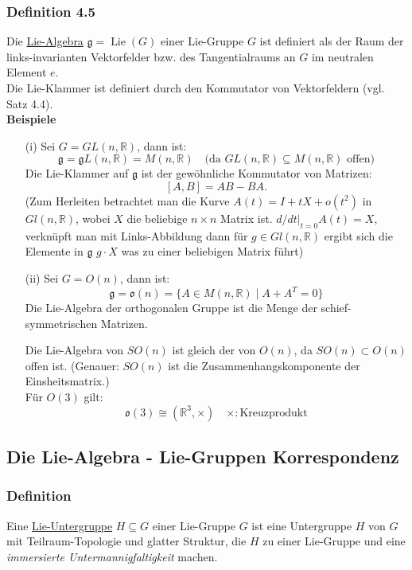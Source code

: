 \documentclass[fleqn, 12pt, letterpaper]{article}
\newcommand{\txt}[1]{\text{#1}}
\begin{document}
\subsubsection*{Definition 4.5}
Die \underline{Lie-Algebra} \( \mathfrak{g} = \operatorname{Lie}(G) \) einer Lie-Gruppe \( G \) ist definiert als der Raum der links-invarianten Vektorfelder bzw. des Tangentialraums an \( G \) im neutralen Element \( e \). \\

Die Lie-Klammer ist definiert durch den Kommutator von Vektorfeldern (vgl. Satz 4.4).\\

\textbf{Beispiele}
\begin{itemize}
    \item[(i)] Sei \( G = GL(n, \mathbb{R}) \), dann ist:
    \[
    \mathfrak{g} = \mathfrak{g}L(n,\mathbb{R}) = M(n, \mathbb{R}) \quad \text{(da } GL(n, \mathbb{R}) \subseteq M(n, \mathbb{R}) \text{ offen)}
    \]
    Die Lie-Klammer auf \( \mathfrak{g} \) ist der gewöhnliche Kommutator von Matrizen:
    \[
    [A, B] = AB - BA.
    \]
    (Zum Herleiten betrachtet man die Kurve $A(t)=I+tX+o(t^2)$ in $Gl(n,\mathbb{R})$, wobei $X$ die beliebige $n\times n$ Matrix ist. $d/dt|_{t=0}A(t)=X$, verknüpft man mit Links-Abbildung dann für $g\in Gl(n,\mathbb{R})$ ergibt sich die Elemente in $\mathfrak{g}$ $g\cdot X$ was zu einer beliebigen Matrix führt)    
    \item[(ii)] Sei \( G = O(n) \), dann ist:
    \[
    \mathfrak{g} = \mathfrak{o}(n) = \{A \in M(n, \mathbb{R}) \mid A + A^T = 0\}
    \]
    Die Lie-Algebra der orthogonalen Gruppe ist die Menge der schief-symmetrischen Matrizen. 

    Die Lie-Algebra von \( SO(n) \) ist gleich der von \( O(n) \), da \( SO(n) \subset O(n) \) offen ist. (Genauer: \( SO(n) \) ist die Zusammenhangskomponente der Einsheitsmatrix.)\\
    
    Für \( O(3) \) gilt:
    \[
    \mathfrak{o}(3) \cong (\mathbb{R}^3, \times) \quad \times: \txt{Kreuzprodukt}
    \]
\end{itemize}

\subsection{Die Lie-Algebra - Lie-Gruppen Korrespondenz}

\subsubsection*{Definition}
Eine \underline{Lie-Untergruppe} \( H \subseteq G \) einer Lie-Gruppe \( G \) ist eine Untergruppe \( H \) von \( G \) mit Teilraum-Topologie und glatter Struktur, die $H$ zu einer Lie-Gruppe und eine \emph{immersierte Untermannigfaltigkeit} machen.\\
\end{document}

